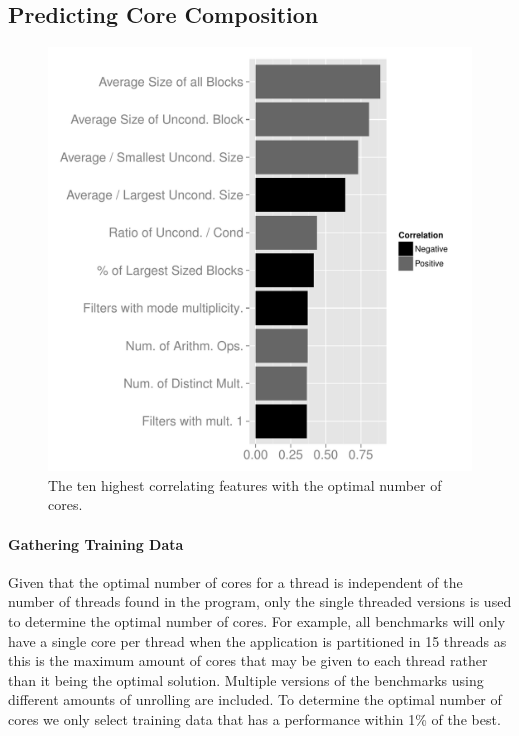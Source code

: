 \subsection{Predicting Core Composition}

\begin{figure}
  \includegraphics[width=1\textwidth]{streamit-paper/graphics/coreCorr.pdf}
  \caption{The ten highest correlating features with the optimal number of cores.}\label{fig:corrCore}
\end{figure}
\paragraph{Gathering Training Data}
Given that the optimal number of cores for a thread is independent of the number of threads found in the program, only the single threaded versions is used to determine the optimal number of cores.
For example, all benchmarks will only have a single core per thread when the application is partitioned in 15 threads as this is the maximum amount of cores that may be given to each thread rather than it being the optimal solution. 
Multiple versions of the benchmarks using different amounts of unrolling are included.
To determine the optimal number of cores we only select training data that has a performance within 1\% of the best. 

